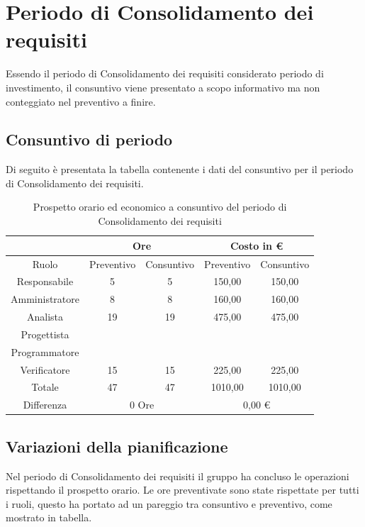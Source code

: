 \documentclass[./PianodiProgetto.tex]{subfiles}
\begin{document}
\section{Periodo di Consolidamento dei requisiti}
Essendo il periodo di Consolidamento dei requisiti considerato periodo di investimento, il consuntivo viene presentato a scopo informativo ma non conteggiato nel preventivo a finire.

\subsection{Consuntivo di periodo}
Di seguito è presentata la tabella contenente i dati del consuntivo per il
periodo di Consolidamento dei requisiti.

\begin{table}[H]
	\centering
	\begin{tabular}{|c|c|c|c|c|}
		\hline
		& \multicolumn{2}{c|}{Ore} & \multicolumn{2}{c|}{Costo in \euro{}}  \\ \hline
		Ruolo&Preventivo&Consuntivo&Preventivo&Consuntivo \\ \hline
		Responsabile&5&5&150,00&150,00  \\ \hline
		Amministratore&8&8&160,00&160,00  \\ \hline
		Analista&19&19&475,00&475,00  \\ \hline
		Progettista& & & &  \\ \hline
		Programmatore& & & &  \\ \hline
		Verificatore&15&15&225,00&225,00  \\ \hline
		Totale&47&47&1010,00&1010,00  \\ \hline
		Differenza& \multicolumn{2}{c|}{0 Ore} & \multicolumn{2}{c|}{0,00 \euro{}} \\ \hline
	\end{tabular}
	\caption{Prospetto orario ed economico a consuntivo del periodo di Consolidamento dei requisiti}
\end{table}

\subsection{Variazioni della pianificazione}
Nel periodo di Consolidamento dei requisiti il gruppo ha concluso le operazioni rispettando il prospetto orario. Le ore preventivate sono state rispettate per tutti i ruoli, questo ha portato ad un pareggio tra consuntivo e preventivo, come mostrato in tabella.
\end{document}
